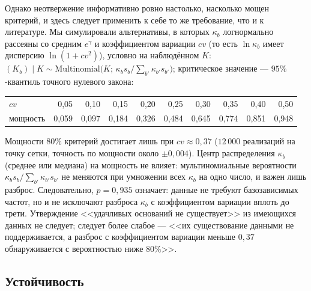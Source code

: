 \documentclass[11pt,a4paper]{article}
\theoremstyle{plain}
\theoremstyle{remark}
\newcommand{\eg}{e^{\gamma}}
\begin{document}
Однако неотвержение информативно ровно настолько, насколько мощен критерий, и здесь
следует применить к себе то же требование, что и к литературе. Мы симулировали
альтернативы, в которых $\kappa_b$ логнормально рассеяны со средним $\eg$ и
коэффициентом вариации $cv$ (то есть $\ln\kappa_b$ имеет дисперсию $\ln(1+cv^2)$),
условно на наблюдённом $K$: $(K_b)\mid K\sim\mathrm{Multinomial}\bigl(K;\,
\kappa_bs_b/\sum_{b'}\kappa_{b'}s_{b'}\bigr)$; критическое значение --- $95\%$-квантиль
точного нулевого закона:

\begin{center}
\small
\begin{tabular}{lrrrrrrrrr}
\toprule
$cv$ & 0{,}05 & 0{,}10 & 0{,}15 & 0{,}20 & 0{,}25 & 0{,}30 & 0{,}35 & 0{,}40 & 0{,}50\\
мощность & 0{,}059 & 0{,}097 & 0{,}184 & 0{,}326 & 0{,}484 & 0{,}645 & 0{,}774 & 0{,}851 & 0{,}948\\
\bottomrule
\end{tabular}
\end{center}

Мощности $80\%$ критерий достигает лишь при $cv\approx0{,}37$ ($12\,000$ реализаций
на точку сетки, точность по мощности около $\pm0{,}004$). Центр распределения
$\kappa_b$ (среднее или медиана) на мощность не влияет: мультиномиальные
вероятности $\kappa_bs_b/\sum_{b'}\kappa_{b'}s_{b'}$ не меняются при умножении всех
$\kappa_b$ на одно число, и важен лишь разброс. Следовательно,
$p=0{,}935$ означает: данные не требуют базозависимых частот, но и не исключают
разброса $\kappa_b$ с коэффициентом вариации вплоть до трети. Утверждение
<<удачливых оснований не существует>> из имеющихся данных не следует; следует более
слабое --- <<их существование данными не поддерживается, а разброс с коэффициентом
вариации меньше $0{,}37$ обнаруживается с вероятностью ниже $80\%$>>.

\subsection{Устойчивость}\label{sec:robust}
\end{document}

